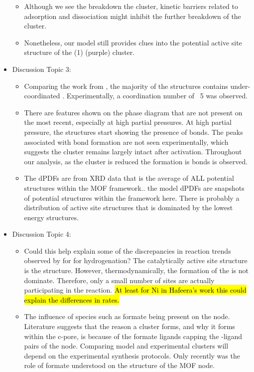 \documentclass[journal=jctcce,manuscript=article]{achemso}
\begin{document}
\begin{itemize}
\begin{itemize}
        \item Although we see the breakdown the cluster, kinetic barriers related to  adsorption and dissociation might inhibit the further breakdown of the cluster.
        \item Nonetheless, our model still provides clues into the potential active site structure of the (1)  (purple) cluster. 
    \end{itemize}
    \item Discussion Topic 3:
    \begin{itemize}
        \item  Comparing the work from \citeauthor{PlateroPrats2017}, the majority of the structures contains under-coordinated . Experimentally, a coordination number of ~5 was observed.
        \item There are features shown on the phase diagram that are not present on the most recent, especially at high  partial pressures. At high  partial pressure, the structures start showing the presence of  bonds. The peaks associated with  bond formation are not seen experimentally, which suggests the cluster remains largely intact after activation. Throughout our analysis, as the cluster is reduced the formation is  bonds is observed.     
        \item The dPDFs are from XRD data that is the average of ALL potential structures within the MOF framework.. the model dPDFs are snapshots of potential structures within the framework here. There is probably a distribution of active site structures that is dominated by the lowest energy structures. 
    \end{itemize}
    \item Discussion Topic 4:
    \begin{itemize}
        \item Could this help explain some of the discrepancies in reaction trends observed by \citeauthor{Shabbir2020} for  for  hydrogenation? The catalytically active site structure is the  structure. However, thermodynamically, the formation of the  is not dominate. Therefore, only a small number of sites are actually participating in the reaction. \hl{At least for Ni in Hafeera's work this could explain the differences in rates.}
        \item The influence of species such as formate being present on the node. Literature suggests that the reason a cluster forms, and why it forms within the c-pore, is because of the formate ligands capping the -ligand pairs of the node. Comparing model and experimental clusters will depend on the experimental synthesis protocols. Only recently was the role of formate understood on the structure of the MOF node.  
    \end{itemize}
\end{itemize}
\end{document}
